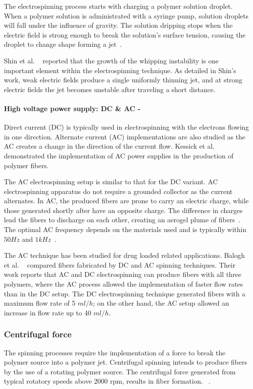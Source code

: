 The electrospinning process starts with charging a polymer solution droplet. When a polymer solution is administrated with a syringe pump, solution droplets will fall under the influence of gravity. The solution dripping stops when the electric field is strong enough to break the solution's surface tension, causing the droplet to change shape forming a jet\unskip~\cite{527120:12033655}.

Shin et al. \unskip~\cite{527120:13659926} reported that the growth of the whipping instability is one important element within the electrospinning technique. As detailed in Shin's work, weak electric fields produce a single uniformly thinning jet, and at strong electric fields the jet becomes unstable after traveling a short distance.


\paragraph{High voltage power supply: DC \& AC - }Direct current (DC) is typically used in electrospinning with the electrons flowing in one direction. Alternate current (AC) implementations are also studied as the AC creates a change in the direction of the current flow. Kessick et al.\unskip~\cite{527120:13444381} demonstrated the implementation of AC power supplies in the production of polymer fibers.

The AC electrospinning setup is similar to that for the DC variant. AC electrospinning apparatus do not require a grounded collector as the current alternates. In AC, the produced fibers are prone to carry an electric charge, while those generated shortly after have an opposite charge. The difference in charges lead the fibers to discharge on each other, creating an aerogel plume of fibers\unskip~\cite{527120:16885570}. The optimal AC frequency depends on the materials used and is typically within  $50Hz $ and  $1kHz $\unskip~\cite{527120:13443405}.

The AC technique has been studied for drug loaded related applications. Balogh et al. \unskip~\cite{527120:13445177} compared fibers fabricated by DC and AC spinning techniques. Their work reports that AC and DC electrospinning can produce fibers with all three polymers, where the AC process allowed the implementation of faster flow rates than in the DC setup. The DC electrospinning technique generated fibers with a maximum flow rate of 5 $ml/h $; on the other hand, the AC setup allowed an increase in flow rate up to 40 $ml/h $.


\subsubsection{Centrifugal force}The spinning processes require the implementation of a force to break the polymer source into a polymer jet. Centrifugal spinning intends to produce fibers by the use of a rotating polymer source. The centrifugal force generated from typical rotatory speeds above $2000 \textrm{ rpm}$, results in fiber formation. \unskip~\cite{527120:13535559,527120:13535561}.


